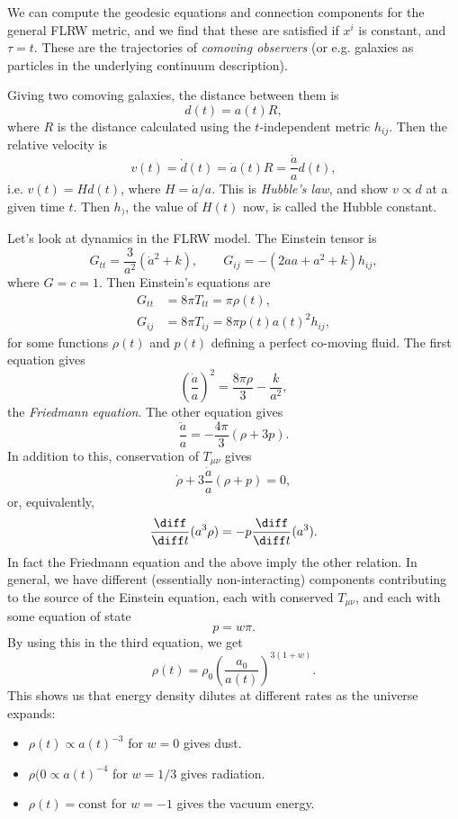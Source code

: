 \documentclass[12pt]{article}
\begin{document}
We can compute the geodesic equations and connection components for the general FLRW metric, and we find that these are satisfied if $x^i$ is constant, and $\tau = t$. These are the trajectories of \emph{comoving observers} (or e.g. galaxies as particles in the underlying continuum description).

Giving two comoving galaxies, the distance between them is
\[
d(t) = a(t) R,
\]
where $R$ is the distance calculated using the $t$-independent metric $h_{ij}$. Then the relative velocity is
\[
v(t) = \dot d(t) = \dot a(t) R = \frac{\dot a}{a} d(t),
\]
i.e. $v(t) = H d(t)$, where $H = \dot a/ a$. This is \emph{Hubble's law}, and show $v \propto d$ at a given time $t$. Then $h_)$, the value of $H(t)$ now, is called the Hubble constant.

Let's look at dynamics in the FLRW model. The Einstein tensor is
\[
G_{tt} = \frac{3}{a^2}(\dot a^2 + k), \qquad G_{ij} = - (2 \ddot a a + a^2 + k) h_{ij},
\]
where $G = c = 1$. Then Einstein's equations are
\begin{align*}
	G_{tt} &= 8 \pi T_{tt} = \pi \rho(t), \\
	G_{ij} &= 8 \pi T_{ij} = 8 \pi p(t) a(t)^2 h_{ij},
\end{align*}
for some functions $\rho(t)$ and $p(t)$ defining a perfect co-moving fluid. The first equation gives
\[
\left( \frac{\dot a}{a} \right)^2= \frac{8 \pi \rho}{3} - \frac{k}{a^2},
\]
the \emph{Friedmann equation}. The other equation gives
\[
\frac{\ddot a}{a} = - \frac{4 \pi}{3} (\rho + 3p).
\]
In addition to this, conservation of $T_{\mu\nu}$ gives
\[
\dot \rho + 3 \frac{\dot a}{a} (\rho + p) = 0,
\]
or, equivalently,
\[
\frac{\diff}{\diff t}(a^3 \rho) = - p \frac{\diff}{\diff t}(a^3).
\]
In fact the Friedmann equation and the above imply the other relation. In general, we have different (essentially non-interacting) components contributing to the source of the Einstein equation, each with conserved $T_{\mu\nu}$, and each with some equation of state
\[
p = w \pi.
\]
By using this in the third equation, we get
\[
\rho(t) = \rho_0 \left( \frac{a_0}{a(t)} \right)^{3(1+w)}.
\]
This shows us that energy density dilutes at different rates as the universe expands:
\begin{itemize}
	\item $\rho(t) \propto a(t)^{-3}$ for $w = 0$ gives dust.
	\item $\rho(0 \propto a(t)^{-4}$ for $w = 1/3$ gives radiation.
	\item $\rho(t) = \text{const}$ for $w = -1$ gives the vacuum energy.
\end{itemize}
\end{document}
